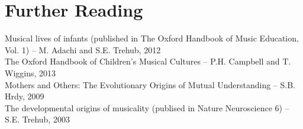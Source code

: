 \documentclass{beamer}
\begin{document}
\section{Further Reading}
\begin{frame}
	Musical lives of infants (published in The Oxford Handbook of Music Education, Vol. 1) -- M. Adachi and S.E. Trehub, 2012\\
	The Oxford Handbook of Children's Musical Cultures -- P.H. Campbell and T. Wiggins, 2013\\
	Mothers and Others: The Evolutionary Origins of Mutual Understanding -- S.B. Hrdy, 2009\\
	The developmental origins of musicality (publised in Nature Neuroscience 6) -- S.E. Trehub, 2003
	
\end{frame}
\end{document}
